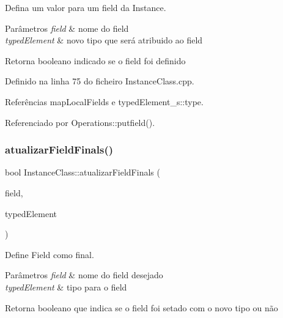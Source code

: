 Defina um valor para um field da Instance. 


\begin{DoxyParams}{Parâmetros}
{\em field} & nome do field \\
\hline
{\em typed\+Element} & novo tipo que será atribuido ao field \\
\hline
\end{DoxyParams}
\begin{DoxyReturn}{Retorna}
booleano indicado se o field foi definido 
\end{DoxyReturn}


Definido na linha 75 do ficheiro Instance\+Class.\+cpp.



Referências map\+Local\+Fields e typed\+Element\+\_\+s\+::type.



Referenciado por Operations\+::putfield().

\mbox{\label{classInstanceClass_a05a47d4bf656908ce3dacc53d9d791b2}} 
\subsubsection{\texorpdfstring{atualizar\+Field\+Finals()}{atualizarFieldFinals()}}
{\footnotesize\ttfamily bool Instance\+Class\+::atualizar\+Field\+Finals (\begin{DoxyParamCaption}\item[{string}]{field,  }\item[{\hyperlink{BasicTypes_8h_a97b332303b1262282599e6ede0637b82}{Typed\+Element}}]{typed\+Element }\end{DoxyParamCaption})}



Define Field como final. 


\begin{DoxyParams}{Parâmetros}
{\em field} & nome do field desejado \\
\hline
{\em typed\+Element} & tipo para o field \\
\hline
\end{DoxyParams}
\begin{DoxyReturn}{Retorna}
booleano que indica se o field foi setado com o novo tipo ou não 
\end{DoxyReturn}


